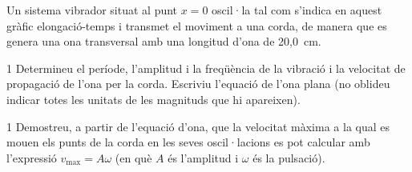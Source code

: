 Un sistema vibrador situat al punt $x = 0$ oscil·la tal com s'indica en aquest gràfic elongació-temps i transmet el moviment a una corda, de manera que es genera una ona transversal amb una longitud d'ona de 20,0~cm.


\begin{apartat}{1}
Determineu el període, l'amplitud i la freqüència de la vibració i la velocitat de propagació de l'ona per la corda. Escriviu l'equació de l'ona plana (no oblideu indicar totes les unitats de les magnituds que hi apareixen).
\end{apartat}

\begin{apartat}{1}
Demostreu, a partir de l'equació d'ona, que la velocitat màxima a la qual es mouen els punts de la corda en les seves oscil·lacions es pot calcular amb l'expressió $v_\mathrm{max} = A\omega$ (en què $A$ és l'amplitud i $\omega$ és la pulsació).
\end{apartat}
